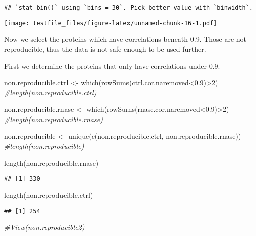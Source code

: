 \documentclass[
]{article}
\newenvironment{Shaded}{\begin{snugshade}}{\end{snugshade}}
\newcommand{\CommentTok}[1]{\textcolor[rgb]{0.56,0.35,0.01}{\textit{#1}}}
\newcommand{\DecValTok}[1]{\textcolor[rgb]{0.00,0.00,0.81}{#1}}
\newcommand{\FloatTok}[1]{\textcolor[rgb]{0.00,0.00,0.81}{#1}}
\newcommand{\FunctionTok}[1]{\textcolor[rgb]{0.00,0.00,0.00}{#1}}
\newcommand{\NormalTok}[1]{#1}
\newcommand{\OtherTok}[1]{\textcolor[rgb]{0.56,0.35,0.01}{#1}}
\newcommand{\SpecialCharTok}[1]{\textcolor[rgb]{0.00,0.00,0.00}{#1}}
\begin{document}
\begin{verbatim}
## `stat_bin()` using `bins = 30`. Pick better value with `binwidth`.
\end{verbatim}

\texttt{[image: testfile\_files/figure-latex/unnamed-chunk-16-1.pdf]}

Now we select the proteins which have correlations beneath 0.9. Those
are not reproducible, thus the data is not safe enough to be used
further.

First we determine the proteins that only have correlations under 0.9.

\begin{Shaded}
\begin{Highlighting}[]
\NormalTok{non.reproducible.ctrl }\OtherTok{\textless{}{-}} \FunctionTok{which}\NormalTok{(}\FunctionTok{rowSums}\NormalTok{(ctrl.cor.naremoved}\SpecialCharTok{\textless{}}\FloatTok{0.9}\NormalTok{)}\SpecialCharTok{\textgreater{}}\DecValTok{2}\NormalTok{)}
\CommentTok{\#length(non.reproducible.ctrl)}

\NormalTok{non.reproducible.rnase }\OtherTok{\textless{}{-}} \FunctionTok{which}\NormalTok{(}\FunctionTok{rowSums}\NormalTok{(rnase.cor.naremoved}\SpecialCharTok{\textless{}}\FloatTok{0.9}\NormalTok{)}\SpecialCharTok{\textgreater{}}\DecValTok{2}\NormalTok{)}
\CommentTok{\#length(non.reproducible.rnase)}

\NormalTok{non.reproducible }\OtherTok{\textless{}{-}} \FunctionTok{unique}\NormalTok{(}\FunctionTok{c}\NormalTok{(non.reproducible.ctrl, non.reproducible.rnase))}
\CommentTok{\#length(non.reproducible)}

\FunctionTok{length}\NormalTok{(non.reproducible.rnase)}
\end{Highlighting}
\end{Shaded}

\begin{verbatim}
## [1] 330
\end{verbatim}

\begin{Shaded}
\begin{Highlighting}[]
\FunctionTok{length}\NormalTok{(non.reproducible.ctrl)}
\end{Highlighting}
\end{Shaded}

\begin{verbatim}
## [1] 254
\end{verbatim}

\begin{Shaded}
\begin{Highlighting}[]
\CommentTok{\#View(non.reproducible2)}
\end{Highlighting}
\end{Shaded}
\end{document}
